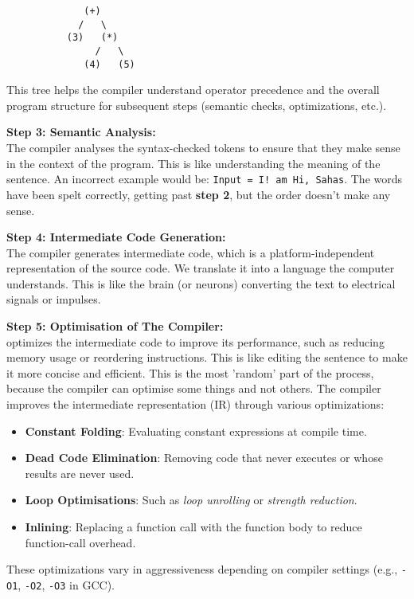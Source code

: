 \documentclass[a4paper,12pt]{article}
\begin{document}
\begin{figure}[H]
\centering
\begin{verbatim}
        (+)
       /   \
     (3)   (*)
          /   \
        (4)   (5)
\end{verbatim}
\end{figure}

This tree helps the compiler understand operator precedence and the overall program 
structure for subsequent steps (semantic checks, optimizations, etc.).

\textbf{Step 3: Semantic Analysis:}\\ The compiler analyses the syntax-checked tokens to ensure that they make sense in the context of the program. This is like understanding the meaning of the sentence. An incorrect example would be: \verb|Input = I! am Hi, Sahas|. The words have been spelt correctly, getting past \textbf{step 2}, but the order doesn't make any sense. 

\textbf{Step 4: Intermediate Code Generation:}\\ The compiler generates intermediate code, which is a platform-independent representation of the source code. We translate it into a language the computer understands. This is like the brain (or neurons) converting the text to electrical signals or impulses.

\textbf{Step 5: Optimisation of The Compiler:}\\ optimizes the intermediate code to improve its performance, such as reducing memory usage or reordering instructions. This is like editing the sentence to make it more concise and efficient. This is the most 'random' part of the process, because the compiler can optimise some things and not others. The compiler improves the intermediate representation (IR) through various optimizations:
\begin{itemize}
    \item \textbf{Constant Folding}: Evaluating constant expressions at compile time.
    \item \textbf{Dead Code Elimination}: Removing code that never executes or whose results are never used.
    \item \textbf{Loop Optimisations}: Such as \textit{loop unrolling} or \textit{strength reduction}.
    \item \textbf{Inlining}: Replacing a function call with the function body to reduce function-call overhead.
\end{itemize}
These optimizations vary in aggressiveness depending on compiler settings (e.g., \texttt{-O1}, 
\texttt{-O2}, \texttt{-O3} in GCC).
\end{document}
